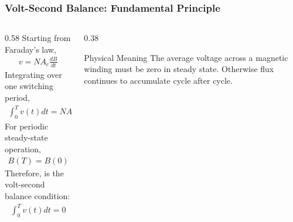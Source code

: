 \begin{frame} 
    \frametitle{Volt-Second Balance: Fundamental Principle} 
    \begin{columns} 
        \begin{column}{0.58\textwidth} 
            Starting from Faraday's law, 
            \begin{align} 
                v=N A_c\frac{dB}{dt} 
            \end{align} 
            Integrating over one switching period, 
            \begin{align} 
                \int_0^T v(t)dt = NA_c \int_0^T dB 
            \end{align} 
            For periodic steady-state operation, 
            \begin{align} 
                B(T)=B(0) 
            \end{align} 
            Therefore, is the volt-second balance condition: 
            \begin{align} 
                \int_0^T v(t)dt=0 
            \end{align} 
        \end{column} 
        \begin{column}{0.38\textwidth} 
            \begin{block}{Physical Meaning} The average voltage across a magnetic winding must be zero in steady state. Otherwise flux continues to accumulate cycle after cycle. 
            \end{block} 
        \end{column} 
    \end{columns} 
\end{frame}

